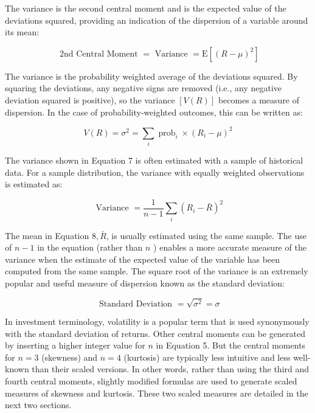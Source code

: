 \documentclass[11pt]{article}
\begin{document}
The variance is the second central moment and is the expected value of the deviations squared, providing an indication of the dispersion of a variable around its mean:


\begin{equation*}
\text { 2nd Central Moment }=\text { Variance }=\mathrm{E}\left[(R-\mu)^{2}\right] \tag{6}
\end{equation*}


The variance is the probability weighted average of the deviations squared. By squaring the deviations, any negative signs are removed (i.e., any negative deviation squared is positive), so the variance $[V(R)]$ becomes a measure of dispersion. In the case of probability-weighted outcomes, this can be written as:


\begin{equation*}
V(R)=\sigma^{2}=\sum_{i} \operatorname{prob}_{i} \times\left(R_{i}-\mu\right)^{2} \tag{7}
\end{equation*}


The variance shown in Equation 7 is often estimated with a sample of historical data. For a sample distribution, the variance with equally weighted observations is estimated as:


\begin{equation*}
\text { Variance }=\frac{1}{n-1} \sum_{i}\left(R_{i}-\bar{R}\right)^{2} \tag{8}
\end{equation*}


The mean in Equation $8, \bar{R}$, is usually estimated using the same sample. The use of $n-1$ in the equation (rather than $n$ ) enables a more accurate measure of the variance when the estimate of the expected value of the variable has been computed from the same sample. The square root of the variance is an extremely popular and useful measure of dispersion known as the standard deviation:


\begin{equation*}
\text { Standard Deviation }=\sqrt{\sigma^{2}}=\sigma \tag{9}
\end{equation*}


In investment terminology, volatility is a popular term that is used synonymously with the standard deviation of returns. Other central moments can be generated by inserting a higher integer value for $n$ in Equation 5. But the central moments for $n=3$ (skewness) and $n=4$ (kurtosis) are typically less intuitive and less well-known than their scaled versions. In other words, rather than using the third and fourth central moments, slightly modified formulas are used to generate scaled measures of skewness and kurtosis. These two scaled measures are detailed in the next two sections.
\end{document}
